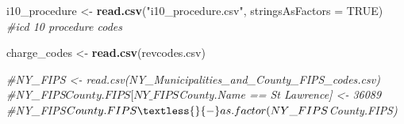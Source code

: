 \documentclass[preprint, 3p,
authoryear]{elsarticle} %
\newenvironment{Shaded}{\begin{snugshade}}{\end{snugshade}}
\newcommand{\CommentTok}[1]{\textcolor[rgb]{0.56,0.35,0.01}{\textit{#1}}}
\newcommand{\DataTypeTok}[1]{\textcolor[rgb]{0.13,0.29,0.53}{#1}}
\newcommand{\KeywordTok}[1]{\textcolor[rgb]{0.13,0.29,0.53}{\textbf{#1}}}
\newcommand{\NormalTok}[1]{#1}
\newcommand{\OtherTok}[1]{\textcolor[rgb]{0.56,0.35,0.01}{#1}}
\newcommand{\StringTok}[1]{\textcolor[rgb]{0.31,0.60,0.02}{#1}}
\begin{document}
\begin{Shaded}
\begin{Highlighting}[]
\NormalTok{i10\_procedure \textless{}{-}}\StringTok{ }\KeywordTok{read.csv}\NormalTok{(}\StringTok{"i10\_procedure.csv"}\NormalTok{, }\DataTypeTok{stringsAsFactors =} \OtherTok{TRUE}\NormalTok{) }\CommentTok{\#icd 10 procedure codes}

\NormalTok{charge\_codes \textless{}{-}}\StringTok{ }\KeywordTok{read.csv}\NormalTok{(}\StringTok{\textquotesingle{}revcodes.csv\textquotesingle{}}\NormalTok{)}

\CommentTok{\#NY\_FIPS \textless{}{-} read.csv(\textquotesingle{}NY\_Municipalities\_and\_County\_FIPS\_codes.csv\textquotesingle{})}
\CommentTok{\#NY\_FIPS$County.FIPS[NY\_FIPS$County.Name == \textquotesingle{}St Lawrence\textquotesingle{}] \textless{}{-} 36089}
\CommentTok{\#NY\_FIPS$County.FIPS \textless{}{-} as.factor(NY\_FIPS$County.FIPS)}
\end{Highlighting}
\end{Shaded}
\end{document}
